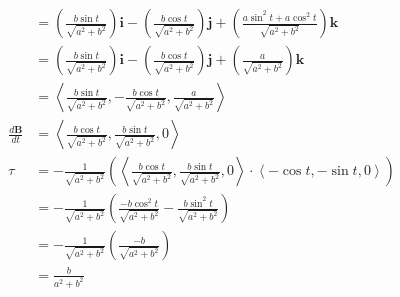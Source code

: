 \documentclass{article}
\newcommand{\lrp}[1]{\left( #1 \right)}
\newcommand{\lra}[1]{\left\langle #1 \right\rangle}
\renewcommand{\i}[0]{\mathbf{i}}
\renewcommand{\j}[0]{\mathbf{j}}
\renewcommand{\k}[0]{\mathbf{k}}
\newcommand{\B}[0]{\mathbf{B}}
\begin{document}
\begin{align*}
&=\lrp{\frac{b\sin t}{\sqrt{a^2+b^2}}}\i -\lrp{\frac{b\cos t}{\sqrt{a^2+b^2}}}\j+\lrp{\frac{a\sin^2 t+a\cos^2t}{\sqrt{a^2+b^2}}}\k\\
&=\lrp{\frac{b\sin t}{\sqrt{a^2+b^2}}}\i -\lrp{\frac{b\cos t}{\sqrt{a^2+b^2}}}\j+\lrp{\frac{a}{\sqrt{a^2+b^2}}}\k\tag{$\sin^2 t + \cos^2 t=1$}\\
&=\lra{\frac{b\sin t}{\sqrt{a^2+b^2}},-\frac{b\cos t}{\sqrt{a^2+b^2}}, \frac{a}{\sqrt{a^2+b^2}}}\\
\frac{d\B}{dt}&=\lra{\frac{b\cos t}{\sqrt{a^2+b^2}},\frac{b\sin t}{\sqrt{a^2+b^2}},0}\\
\tau&=-\frac{1}{\sqrt{a^2+b^2}}\lrp{\lra{\frac{b\cos t}{\sqrt{a^2+b^2}},\frac{b\sin t}{\sqrt{a^2+b^2}},0}\cdot \lra{-\cos t,-\sin t,0}}\\
&=-\frac{1}{\sqrt{a^2+b^2}}\lrp{\frac{-b\cos^2t}{\sqrt{a^2+b^2}}-\frac{b\sin^2t}{\sqrt{a^2+b^2}}}\\
&=-\frac{1}{\sqrt{a^2+b^2}}\lrp{\frac{-b}{\sqrt{a^2+b^2}}}\tag{$\sin^2 t+ \cos^2 t =1$}\\
&=\boxed{\frac{b}{a^2+b^2}}
\end{align*}
\end{document}
